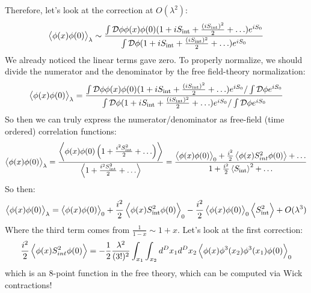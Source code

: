 Therefore, let's look at the correction at $O(\lambda^2)$:
\begin{equation}
    \left< \phi(x)\phi(0) \right>_\lambda \sim \frac{\int \mathcal{D}\phi \phi(x)\phi(0)(1 + iS_{\text{int}} + \frac{(iS_{\text{int}})^2}{2} + \ldots)e^{iS_0}}{\int \mathcal{D}\phi (1 + iS_{\text{int}} + \frac{(iS_{\text{int}})^2}{2} + \ldots)e^{iS_0}}
\end{equation}
We already noticed the linear terms gave zero. To properly normalize, we should divide the numerator and the denominator by the free field-theory normalization:
\begin{equation}
    \left< \phi(x)\phi(0) \right>_\lambda = \frac{\int \mathcal{D}\phi \phi(x)\phi(0)(1 + iS_{\text{int}} + \frac{(iS_{\text{int}})^2}{2} + \ldots)e^{iS_0}/\int \mathcal{D}\phi e^{iS_0}}{\int \mathcal{D}\phi (1 + iS_{\text{int}} + \frac{(iS_{\text{int}})^2}{2} + \ldots)e^{iS_0}/\int \mathcal{D}\phi e^{iS_0}}
\end{equation}
So then we can truly express the numerator/denominator as free-field (time ordered) correlation functions:
\begin{equation}
    \left< \phi(x)\phi(0) \right>_\lambda = \frac{\left< \phi(x)\phi(0)\left(1 + \frac{i^2S_{\text{int}}^2}{2} + \ldots\right) \right>}{\left< 1 + \frac{i^2S_{\text{int}}^2}{2} + \ldots \right>} = \frac{\left< \phi(x)\phi(0) \right>_0 + \frac{i^2}{2}\left< \phi(x)S_{int}^2\phi(0) \right> + \ldots }{1 + \frac{i^2}{2}\left< S_{\text{int}} \right>^2 + \ldots}
\end{equation}
So then:
\begin{equation}
    \left< \phi(x)\phi(0) \right>_\lambda = \left< \phi(x)\phi(0) \right>_0 + \frac{i^2}{2}\left< \phi(x)S_{\text{int}}^2\phi(0) \right>_0 - \frac{i^2}{2}\left< \phi(x)\phi(0) \right>_0\left< S^2_{\text{int}} \right> + O(\lambda^3)
\end{equation}
Where the third term comes from $\frac{1}{1-x} \sim 1 + x$. Let's look at the first correction:
\begin{equation}
    \frac{i^2}{2}\left< \phi(x)S_{int}^2\phi(0) \right> = -\frac{1}{2}\frac{\lambda^2}{(3!)^2}\int_{x_1}\int_{x_2}d^Dx_1d^Dx_2\left< \phi(x)\phi^3(x_2)\phi^3(x_1)\phi(0) \right>_0
\end{equation}
which is an 8-point function in the free theory, which can be computed via Wick contractions!

